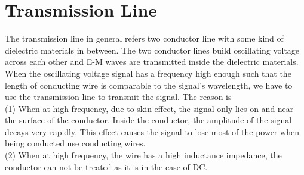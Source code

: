 \documentclass[a4paper]{article}
\begin{document}
\section{Transmission Line}
The transmission line in general refers two conductor line with some kind of dielectric materials in between. The two conductor lines build oscillating voltage across each other and E-M waves are transmitted inside the dielectric materials.
When the oscillating voltage signal has a frequency high enough such that the length of conducting wire is comparable to the signal's wavelength, we have to use the transmission line to transmit the signal. The reason is\\
(1) When at high frequency, due to skin effect, the signal only lies on and near the surface of the conductor. Inside the conductor, the amplitude of the signal decays very rapidly. This effect causes the signal to lose most of the power when being conducted use conducting wires.\\
(2) When at high frequency, the wire has a high inductance impedance, the conductor can not be treated as it is in the case of DC.
\end{document}
